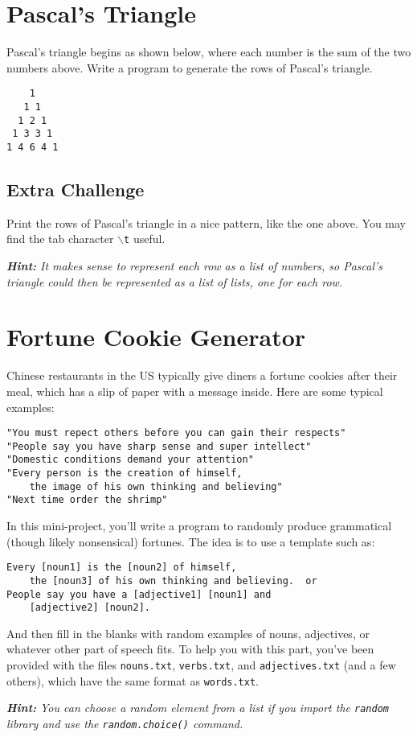 \documentclass{hitec}
\begin{document}
\section{Pascal's Triangle}
Pascal's triangle begins as shown below, where each number is the sum of the two numbers above. Write a program to generate the rows of Pascal's triangle. 

\begin{verbatim}
    1
   1 1
  1 2 1
 1 3 3 1
1 4 6 4 1
\end{verbatim}

\subsection{Extra Challenge}
Print the rows of Pascal's triangle in a nice pattern, like the one above. You may find the tab character \texttt{\textquotesingle$\backslash$t\textquotesingle} useful.

\noindent \emph{\textbf{Hint:} It makes sense to represent each row as a list of numbers, so Pascal's triangle could then be represented as a list of lists, one for each row.}

\section{Fortune Cookie Generator}
Chinese restaurants in the US typically give diners a fortune cookies after their meal, which has a slip of paper with a message inside. Here are some typical examples:

\begin{verbatim}
"You must repect others before you can gain their respects"
"People say you have sharp sense and super intellect"
"Domestic conditions demand your attention"
"Every person is the creation of himself, 
    the image of his own thinking and believing"
"Next time order the shrimp"
\end{verbatim}

\noindent In this mini-project, you'll write a program to randomly produce grammatical (though likely nonsensical) fortunes. The idea is to use a template such as:

\begin{verbatim}
Every [noun1] is the [noun2] of himself, 
    the [noun3] of his own thinking and believing.  or
People say you have a [adjective1] [noun1] and 
    [adjective2] [noun2].
\end{verbatim}

\noindent And then fill in the blanks with random examples of nouns, adjectives, or whatever other part of speech fits. To help you with this part, you've been provided with the files \texttt{nouns.txt}, \texttt{verbs.txt}, and \texttt{adjectives.txt} (and a few others), which have the same format as \texttt{words.txt}.

\noindent \emph{\textbf{Hint:} You can choose a random element from a list if you import the \texttt{random} library and use the \texttt{random.choice()} command.}
\end{document}
